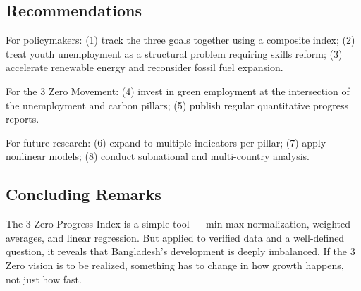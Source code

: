 \documentclass[12pt,a4paper]{article}
\begin{document}
\subsection{Recommendations}

For policymakers: (1) track the three goals together using a composite index; (2) treat youth unemployment as a structural problem requiring skills reform; (3) accelerate renewable energy and reconsider fossil fuel expansion.

For the 3 Zero Movement: (4) invest in green employment at the intersection of the unemployment and carbon pillars; (5) publish regular quantitative progress reports.

For future research: (6) expand to multiple indicators per pillar; (7) apply nonlinear models; (8) conduct subnational and multi-country analysis.

\subsection{Concluding Remarks}

The 3 Zero Progress Index is a simple tool --- min-max normalization, weighted averages, and linear regression. But applied to verified data and a well-defined question, it reveals that Bangladesh's development is deeply imbalanced. If the 3 Zero vision is to be realized, something has to change in how growth happens, not just how fast.



\end{document}
